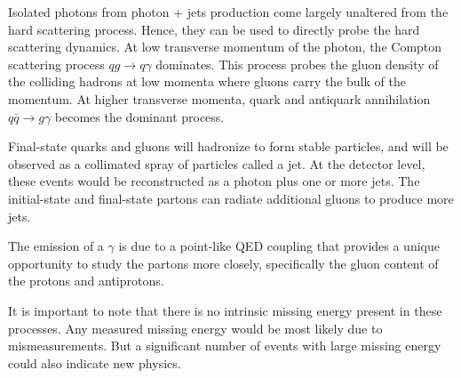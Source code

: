 Isolated photons from photon + jets production come largely unaltered from the hard scattering process. Hence, they can be used to directly probe the hard scattering dynamics. At low transverse momentum of the photon, the Compton scattering process $qg\to q\gamma$ dominates. This process probes the gluon density of the colliding hadrons at low momenta where gluons carry the bulk of the momentum. At higher transverse momenta, quark and antiquark annihilation $q{\bar q}\to g\gamma$ becomes the dominant process.

Final-state quarks and gluons will hadronize to form stable particles, and will be observed as a collimated spray of particles called a jet. At the detector level, these events would be reconstructed as a photon plus one or more jets. The initial-state and final-state partons can radiate additional gluons to produce more jets.

The emission of a $\gamma$ is due to a point-like QED coupling that provides a unique opportunity to study the partons more closely, specifically the gluon content of the protons and antiprotons.

It is important to note that there is no intrinsic missing energy present in these processes. Any measured missing energy would be most likely due to mismeasurements. But a significant number of events with large missing energy could also indicate new physics.

